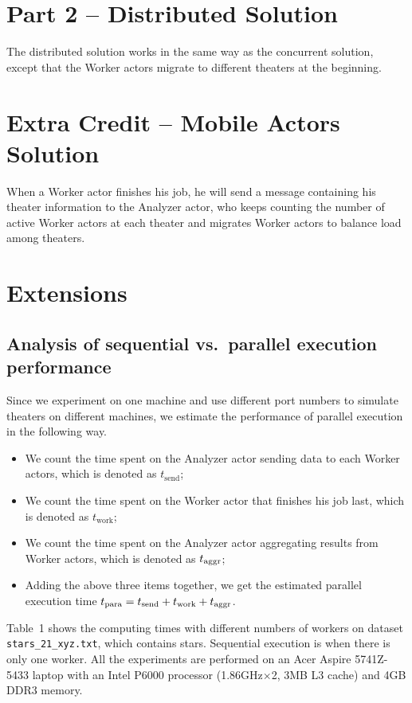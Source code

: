 \documentclass[12pt,letterpaper]{article}
\begin{document}
\section*{Part 2 -- Distributed Solution}
The distributed solution works in the same way as the concurrent solution, except that the Worker actors migrate to different theaters at the beginning.

\section*{Extra Credit -- Mobile Actors Solution}
When a Worker actor finishes his job, he will send a message containing his theater information to the Analyzer actor, who keeps counting the number of active Worker actors at each theater and migrates Worker actors to balance load among theaters.

\section*{Extensions}
\subsection*{Analysis of sequential vs.~parallel execution performance}
Since we experiment on one machine and use different port numbers to simulate theaters on different machines, we estimate the performance of parallel execution in the following way.
\begin{itemize}
\item We count the time spent on the Analyzer actor sending data to each Worker actors, which is denoted as $t_{\textrm{send}}$;
\item We count the time spent on the Worker actor that finishes his job last, which is denoted as $t_{\textrm{work}}$;
\item We count the time spent on the Analyzer actor aggregating results from Worker actors, which is denoted as $t_{\rm aggr}$;
\item Adding the above three items together, we get the estimated parallel execution time $t_{\rm para} = t_{\textrm{send}}+t_{\textrm{work}}+t_{\rm aggr}$.
\end{itemize}

Table~1 shows the computing times with different numbers of workers on dataset \texttt{stars\_21\_xyz.txt}, which contains  stars. Sequential execution is when there is only one worker. All the experiments are performed on an Acer Aspire 5741Z-5433 laptop with an Intel P6000 processor (1.86GHz$\times$2, 3MB L3 cache) and 4GB DDR3 memory.
\end{document}
